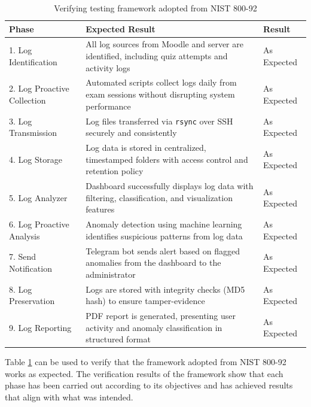 \begin{table}[H]
\centering
\caption{Verifying testing framework adopted from NIST 800-92}
\begin{tabular}{|p{3.2cm}|p{6cm}|p{4cm}|}
\hline
\textbf{Phase} & \textbf{Expected Result} & \textbf{Result} \\ \hline
1. Log Identification & All log sources from Moodle and server are identified, including quiz attempts and activity logs & As Expected \\ \hline
2. Log Proactive Collection & Automated scripts collect logs daily from exam sessions without disrupting system performance & As Expected \\ \hline
3. Log Transmission & Log files transferred via \texttt{rsync} over SSH securely and consistently & As Expected \\ \hline
4. Log Storage & Log data is stored in centralized, timestamped folders with access control and retention policy & As Expected \\ \hline
5. Log Analyzer & Dashboard successfully displays log data with filtering, classification, and visualization features & As Expected \\ \hline
6. Log Proactive Analysis & Anomaly detection using machine learning identifies suspicious patterns from log data & As Expected \\ \hline
7. Send Notification & Telegram bot sends alert based on flagged anomalies from the dashboard to the administrator & As Expected \\ \hline
8. Log Preservation & Logs are stored with integrity checks (MD5 hash) to ensure tamper-evidence & As Expected \\ \hline
9. Log Reporting & PDF report is generated, presenting user activity and anomaly classification in structured format & As Expected \\ \hline
\end{tabular}
\label{tab:verifying_log_framework}
\end{table}


Table \ref{tab:verifying_log_framework} can be used to verify that the framework adopted from NIST 800-92 works as expected. The verification results of the framework show that each phase has been carried out according to its objectives and has achieved results that align with what was intended.

